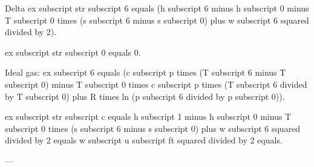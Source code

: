 Delta ex subscript str subscript 6 equals (h subscript 6 minus h subscript 0 minus T subscript 0 times (s subscript 6 minus s subscript 0) plus w subscript 6 squared divided by 2).  

ex subscript str subscript 0 equals 0.  

Ideal gas: ex subscript 6 equals (c subscript p times (T subscript 6 minus T subscript 0) minus T subscript 0 times c subscript p times (T subscript 6 divided by T subscript 0) plus R times ln (p subscript 6 divided by p subscript 0)).  

ex subscript str subscript c equals h subscript 1 minus h subscript 0 minus T subscript 0 times (s subscript 6 minus s subscript 0) plus w subscript 6 squared divided by 2 equals w subscript u subscript ft squared divided by 2 equals.  

---